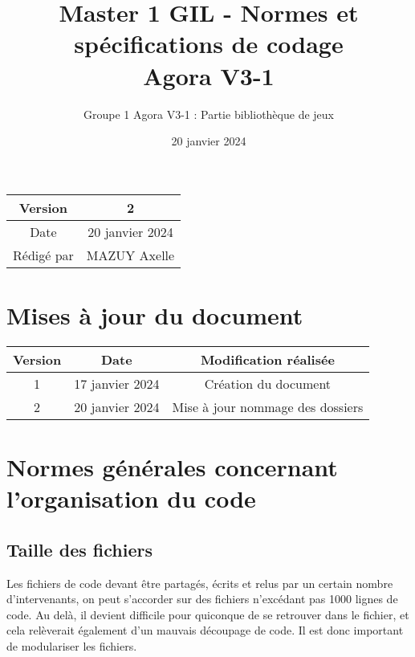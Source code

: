 \documentclass{article}
\title{Master 1 GIL - Normes et spécifications de codage \\
        Agora V3-1}
\author{Groupe 1 Agora V3-1 : Partie bibliothèque de jeux}
\date{20 janvier 2024}
\begin{document}
\maketitle
    \begin{center}
        \begin{tabular}{|| c | c ||}
                \hline 
                Version & 2 \\
                \hline 
                Date & 20 janvier 2024 \\
                \hline
                Rédigé par & MAZUY Axelle\\
                \hline
        \end{tabular}
    \end{center}

    \newpage
    \section*{Mises à jour du document}

    \begin{center}
        \begin{tabular}{|| c | c | c ||}
                \hline 
                Version & Date & Modification réalisée \\
                \hline
                \hline 
                1 & 17 janvier 2024 & Création du document \\
                \hline
                2 & 20 janvier 2024 & Mise à jour nommage des dossiers \\
                \hline
        \end{tabular}
    \end{center}

    \newpage
    \tableofcontents
    \newpage

    \section{Normes générales concernant l'organisation du code}

        \subsection{Taille des fichiers}

            Les fichiers de code devant être partagés, écrits et relus par un certain nombre d'intervenants, on peut s'accorder sur des fichiers n'excédant pas 1000 lignes de code. Au delà, il devient difficile pour quiconque de se retrouver dans le fichier, et cela relèverait également d'un mauvais découpage de code. Il est donc important de modulariser les fichiers.
\end{document}
